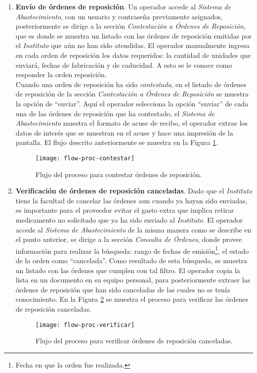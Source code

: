 \begin{enumerate}
\item \textbf{Envío de órdenes de reposición}. Un operador accede al \textit{Sistema de Abastecimiento}, con un usuario y contraseña previamente asignados, posteriormente se dirige a la sección \textit{Contestación a Órdenes de Reposición}, que es donde se muestra un listado con las órdenes de reposición emitidas por el \textit{Instituto} que aún no han sido atendidas. El operador manualmente ingresa en cada orden de reposición los datos requeridos: la cantidad de unidades que enviará, fechas de fabricación y de caducidad. A esto se le conoce como responder la orden reposición.\\
Cuando una orden de reposición ha sido \textit{contestada}, en el listado de órdenes de reposición de la sección \textit{Contestación a Órdenes de Reposición} se muestra la opción de ``enviar''. Aquí el operador selecciona la opción ``enviar'' de cada una de las órdenes de reposición que ha contestado, el \textit{Sistema de Abastecimiento} muestra el formato de acuse de recibo, el operador extrae los datos de interés que se muestran en el acuse y hace una impresión de la pantalla. El flujo descrito anteriormente se muestra en la Figura \ref{fig:flow-proc-contestar}.

\begin{figure}[H]
\centering
\texttt{[image: flow-proc-contestar]} 
\caption{Flujo del proceso para contestar órdenes de reposición.}
\label{fig:flow-proc-contestar}
\end{figure}

\item \textbf{Verificación de órdenes de reposición canceladas}. Dado que el \textit{Instituto} tiene la facultad de cancelar las órdenes aun cuando ya hayan sido enviadas, es importante para el proveedor evitar el gasto extra que implica retirar medicamento no solicitado que ya ha sido enviado al \textit{Instituto}. El operador accede al \textit{Sistema de Abastecimiento} de la misma manera como se describe en el punto anterior, se dirige a la sección \textit{Consulta de Órdenes}, donde provee información para realizar la búsqueda: rango de fechas de emisión\footnote{Fecha en que la orden fue realizada.}, el estado de la orden como ``cancelada''. Como resultado de esta búsqueda, se muestra un listado con las órdenes que cumplen con tal filtro. El operador copia la lista en un documento en su equipo personal, para posteriormente extraer las órdenes de reposición que han sido canceladas de las cuales no se tenía conocimiento. En la Figura \ref{fig:flow-proc-verificar} se muestra el proceso para verificar las órdenes de reposición canceladas.
\begin{figure}[H]
\centering
\texttt{[image: flow-proc-verificar]} 
\caption{Flujo del proceso para verificar órdenes de reposición canceladas.}
\label{fig:flow-proc-verificar}
\end{figure}
\end{enumerate}

